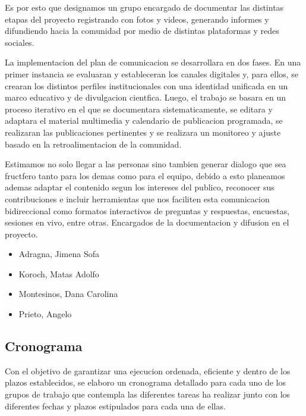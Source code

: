 \begin{itemize}
          Es por esto que designamos un grupo encargado de documentar las distintas etapas
          del proyecto registrando con fotos y videos, generando informes y difundiendo hacia la
          comunidad por medio de distintas plataformas y redes sociales.

          La implementacion del plan de comunicacion se desarrollara en dos fases. En una primer
          instancia se evaluaran y estableceran los canales digitales y, para ellos, se crearan los
          distintos perfiles institucionales con una identidad unificada en un marco educativo
          y de divulgacion cientfica. Luego, el trabajo se basara en un proceso iterativo en el
          que se documentara sistematicamente, se editara y adaptara el material multimedia y
          calendario de publicacion programada, se realizaran las publicaciones pertinentes y se
          realizara un monitoreo y ajuste basado en la retroalimentacion de la comunidad.

          Estimamos no solo llegar a las personas sino tambien generar dialogo que sea fructfero
          tanto para los demas como para el equipo, debido a esto planeamos ademas adaptar el
          contenido segun los intereses del publico, reconocer sus contribuciones e incluir
          herramientas que nos faciliten esta comunicacion bidireccional como formatos interactivos
          de preguntas y respuestas, encuestas, sesiones en vivo, entre otras.
          Encargados de la documentacion y difusion en el proyecto.
          \begin{itemize}
            \item Adragna, Jimena Sofa
            \item Koroch, Matas Adolfo
            \item Montesinos, Dana Carolina
            \item Prieto, Angelo
          \end{itemize}
      \end{itemize}


  \subsection{Cronograma}
    Con el objetivo de garantizar una ejecucion ordenada, eficiente y dentro de los plazos
    establecidos, se elaboro un cronograma detallado para cada uno de los grupos de trabajo que
    contempla las diferentes tareas ha realizar junto con los diferentes fechas y plazos estipulados
    para cada una de ellas.

